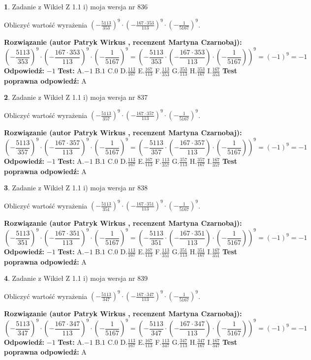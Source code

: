 \documentclass[12pt, a4paper]{article}
\theoremstyle{definition} %
\newtheorem{zad}{}
\newcommand{\zadStart}[1]{\begin{zad}#1\newline}
\newcommand{\zadStop}{\end{zad}}
\newcommand{\rozwStart}[2]{\noindent \textbf{Rozwiązanie (autor #1 , recenzent #2): }\newline}
\newcommand{\rozwStop}{\newline}
\newcommand{\odpStart}{\noindent \textbf{Odpowiedź:}\newline}
\newcommand{\odpStop}{\newline}
\newcommand{\testStart}{\noindent \textbf{Test:}\newline}
\newcommand{\testStop}{\newline}
\newcommand{\kluczStart}{\noindent \textbf{Test poprawna odpowiedź:}\newline}
\newcommand{\kluczStop}{\newline}
\begin{document}
\zadStart{Zadanie z Wikieł Z 1.1 i) moja wersja nr 836}

Obliczyć wartość wyrażenia $(-\frac{5113}{353})^{9} \cdot (-\frac{167 \cdot 353}{113})^{9} \cdot (-\frac{1}{5167})^{9}$.
\zadStop
\rozwStart{Patryk Wirkus}{Martyna Czarnobaj}
$$(-\frac{5113}{353})^{9} \cdot (-\frac{167 \cdot 353}{113})^{9} \cdot (-\frac{1}{5167})^{9} = (-\frac{5113}{353} \cdot (-\frac{167 \cdot 353}{113}) \cdot (-\frac{1}{5167}))^{9} = (-1)^{9} = -1$$
\rozwStop
\odpStart
$-1$
\odpStop
\testStart
A.$-1$ B.$1$ C.$0$ D.$\frac{113}{167}$ E.$\frac{167}{113}$
F.$\frac{113}{353}$ G.$\frac{353}{113}$
H.$\frac{353}{167}$
I.$\frac{167}{353}$
\testStop
\kluczStart
A
\kluczStop



\zadStart{Zadanie z Wikieł Z 1.1 i) moja wersja nr 837}

Obliczyć wartość wyrażenia $(-\frac{5113}{357})^{9} \cdot (-\frac{167 \cdot 357}{113})^{9} \cdot (-\frac{1}{5167})^{9}$.
\zadStop
\rozwStart{Patryk Wirkus}{Martyna Czarnobaj}
$$(-\frac{5113}{357})^{9} \cdot (-\frac{167 \cdot 357}{113})^{9} \cdot (-\frac{1}{5167})^{9} = (-\frac{5113}{357} \cdot (-\frac{167 \cdot 357}{113}) \cdot (-\frac{1}{5167}))^{9} = (-1)^{9} = -1$$
\rozwStop
\odpStart
$-1$
\odpStop
\testStart
A.$-1$ B.$1$ C.$0$ D.$\frac{113}{167}$ E.$\frac{167}{113}$
F.$\frac{113}{357}$ G.$\frac{357}{113}$
H.$\frac{357}{167}$
I.$\frac{167}{357}$
\testStop
\kluczStart
A
\kluczStop



\zadStart{Zadanie z Wikieł Z 1.1 i) moja wersja nr 838}

Obliczyć wartość wyrażenia $(-\frac{5113}{351})^{9} \cdot (-\frac{167 \cdot 351}{113})^{9} \cdot (-\frac{1}{5167})^{9}$.
\zadStop
\rozwStart{Patryk Wirkus}{Martyna Czarnobaj}
$$(-\frac{5113}{351})^{9} \cdot (-\frac{167 \cdot 351}{113})^{9} \cdot (-\frac{1}{5167})^{9} = (-\frac{5113}{351} \cdot (-\frac{167 \cdot 351}{113}) \cdot (-\frac{1}{5167}))^{9} = (-1)^{9} = -1$$
\rozwStop
\odpStart
$-1$
\odpStop
\testStart
A.$-1$ B.$1$ C.$0$ D.$\frac{113}{167}$ E.$\frac{167}{113}$
F.$\frac{113}{351}$ G.$\frac{351}{113}$
H.$\frac{351}{167}$
I.$\frac{167}{351}$
\testStop
\kluczStart
A
\kluczStop



\zadStart{Zadanie z Wikieł Z 1.1 i) moja wersja nr 839}

Obliczyć wartość wyrażenia $(-\frac{5113}{347})^{9} \cdot (-\frac{167 \cdot 347}{113})^{9} \cdot (-\frac{1}{5167})^{9}$.
\zadStop
\rozwStart{Patryk Wirkus}{Martyna Czarnobaj}
$$(-\frac{5113}{347})^{9} \cdot (-\frac{167 \cdot 347}{113})^{9} \cdot (-\frac{1}{5167})^{9} = (-\frac{5113}{347} \cdot (-\frac{167 \cdot 347}{113}) \cdot (-\frac{1}{5167}))^{9} = (-1)^{9} = -1$$
\rozwStop
\odpStart
$-1$
\odpStop
\testStart
A.$-1$ B.$1$ C.$0$ D.$\frac{113}{167}$ E.$\frac{167}{113}$
F.$\frac{113}{347}$ G.$\frac{347}{113}$
H.$\frac{347}{167}$
I.$\frac{167}{347}$
\testStop
\kluczStart
A
\kluczStop
\end{document}
